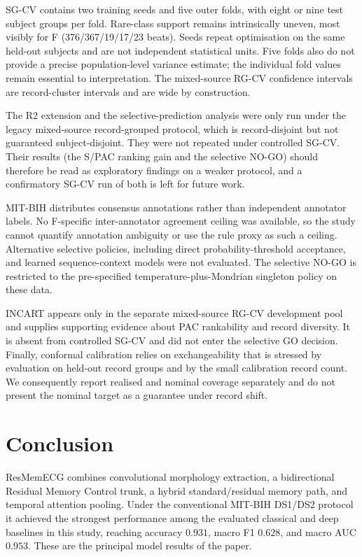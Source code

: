 \documentclass[review,12pt]{elsarticle}
\begin{document}
SG-CV contains two training seeds and five outer folds, with eight or nine test
subject groups per fold. Rare-class support remains intrinsically uneven, most
visibly for F (376/367/19/17/23 beats). Seeds repeat optimisation on the same
held-out subjects and are not independent statistical units. Five folds also do
not provide a precise population-level variance estimate; the individual fold
values remain essential to interpretation. The mixed-source RG-CV confidence
intervals are record-cluster intervals and are wide by construction.

The R2 extension and the selective-prediction analysis were only run under the
legacy mixed-source record-grouped protocol, which is record-disjoint but not
guaranteed subject-disjoint. They were not repeated under controlled SG-CV. Their
results (the S/PAC ranking gain and the selective NO-GO) should therefore be read
as exploratory findings on a weaker protocol, and a confirmatory SG-CV run of
both is left for future work.

MIT-BIH distributes consensus annotations rather than independent annotator
labels. No F-specific inter-annotator agreement ceiling was available, so the
study cannot quantify annotation ambiguity or use the rule proxy as such a
ceiling. Alternative selective policies, including direct probability-threshold
acceptance, and learned sequence-context models were not evaluated. The
selective NO-GO is restricted to the pre-specified temperature-plus-Mondrian
singleton policy on these data.

INCART appears only in the separate mixed-source RG-CV development pool and
supplies supporting evidence about PAC rankability and record diversity. It is
absent from controlled SG-CV and did not enter the selective GO decision.
Finally, conformal calibration
relies on exchangeability that is stressed by evaluation on held-out record
groups and by the small calibration record count. We consequently report
realised and nominal coverage separately and do not present the nominal target
as a guarantee under record shift.

\section{Conclusion}
ResMemECG combines convolutional morphology extraction, a bidirectional
Residual Memory Control trunk, a hybrid standard/residual memory path, and
temporal attention pooling. Under the conventional MIT-BIH DS1/DS2 protocol it
achieved the strongest performance among the evaluated classical and deep baselines in this study,
reaching accuracy $0.931$, macro F1 $0.628$, and macro AUC $0.953$. These are the
principal model results of the paper.
\end{document}
